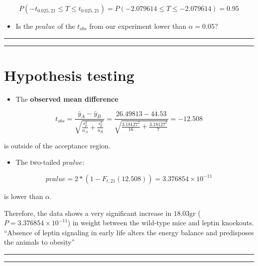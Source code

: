 \documentclass[
]{book}
\providecommand{\tightlist}{%
  \setlength{\itemsep}{0pt}\setlength{\parskip}{0pt}}
\begin{document}
\[P(-t_{0.025, 21} \leq T \leq t_{0.025, 21})=P(-2.079614 \leq T \leq -2.079614)=0.95\]

\begin{itemize}
\tightlist
\item
  Is the \(pvalue\) of the \(t_{obs}\) from our experiment lower than \(\alpha=0.05\)?
\end{itemize}

\begin{center}\rule{0.5\linewidth}{0.5pt}\end{center}

\begin{center}\rule{0.5\linewidth}{0.5pt}\end{center}

\hypertarget{hypothesis-testing-3}{%
\section{Hypothesis testing}\label{hypothesis-testing-3}}

\begin{itemize}
\tightlist
\item
  The \textbf{observed mean difference}
\end{itemize}

\[t_{obs}=\frac{\bar{y}_A-\bar{y}_B }{\sqrt{\frac{s^2_p}{n_A}+\frac{s^2_p}{n_B}}}=\frac{26.49813-44.53}{\sqrt{\frac{3.18127^2}{16}+\frac{3.18127^2}{7}}}=-12.508\]

is outside of the acceptance region.

\begin{itemize}
\tightlist
\item
  The two-tailed \(pvalue\):
\end{itemize}

\[pvalue=2*(1-F_{t,21}(12.508))=3.376854 \times 10^{-11}\]

is lower than \(\alpha\).

Therefore, the data shows a very significant increase in \(18.03\)gr (\(P=3.376854 \times 10^{-11}\)) in weight between the wild-type mice and leptin knockouts. ``Absence of leptin signaling in early life alters the energy balance and predisposes the animals to obesity''

\begin{center}\rule{0.5\linewidth}{0.5pt}\end{center}

\begin{center}\rule{0.5\linewidth}{0.5pt}\end{center}
\end{document}
